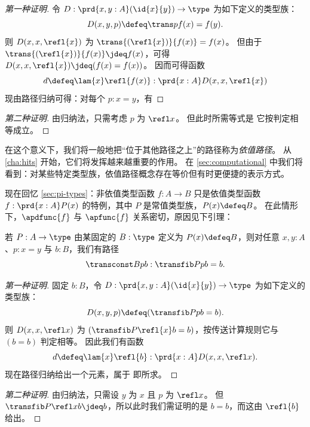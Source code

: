 \begin{proof}[第一种证明]
  令 $D:\prd{x,y:A} (\id{x}{y}) \to \type$ 为如下定义的类型族：
  \begin{equation*}
    D(x,y,p)\defeq \trans p {f(x)}= f(y).
  \end{equation*}
  则 $D(x,x,\refl{x})$ 为 $\trans{(\refl{x})}{f(x)}= f(x)$。
  但由于 $\trans{(\refl{x})}{f(x)}\jdeq f(x)$，可得 $D(x,x,\refl{x})\jdeq (f(x)= f(x))$。
  因而可得函数
  \begin{equation*}
    d\defeq\lam{x} \refl{f(x)}:\prd{x:A} D(x,x,\refl{x})
  \end{equation*}
  现由路径归纳可得：对每个 $p:x= y$，有
\end{proof}

\begin{proof}[第二种证明]
  由归纳法，只需考虑 $p$ 为 $\refl x$。
  但此时所需等式是
  它按判定相等成立。
\end{proof}

在这个意义下，我们将一般地把“位于其他路径之上”的路径称为\emph{依值路径}。
%
%
从 \cref{cha:hits} 开始，它们将发挥越来越重要的作用。
在 \cref{sec:computational} 中我们将看到：对某些特定类型族，依值路径概念存在等价但有时更便捷的表示方式。

现在回忆 \cref{sec:pi-types}：非依值类型函数 $f:A\to B$ 只是依值类型函数 $f:\prd{x:A} P(x)$ 的特例，其中 $P$ 是常值类型族，$P(x) \defeq B$。
在此情形下，$\apdfunc{f}$ 与 $\apfunc{f}$ 关系密切，原因见下引理：

\begin{lem}\label{thm:trans-trivial}
  若 $P:A\to\type$ 由某固定的 $B:\type$ 定义为 $P(x) \defeq B$，则对任意 $x,y:A$、$p:x=y$ 与 $b:B$，我们有路径
  \[ \transconst Bpb : \transfib P p b = b. \]
\end{lem}
\begin{proof}[第一种证明]
  固定 $b:B$，令 $D:\prd{x,y:A} (\id{x}{y}) \to \type$ 为如下定义的类型族：
  \[ D(x,y,p) \defeq (\transfib P p b = b). \]
  则 $D(x,x,\refl x)$ 为 $(\transfib P{\refl{x}}{b} = b)$，按传送计算规则它与 $(b=b)$ 判定相等。
  因此我们有函数
  \[ d \defeq \lam{x} \refl{b} : \prd{x:A} D(x,x,\refl x). \]
  现在路径归纳给出一个元素，属于
  即所求。
\end{proof}
\begin{proof}[第二种证明]
  由归纳法，只需设 $y$ 为 $x$ 且 $p$ 为 $\refl x$。
  但 $\transfib P {\refl x} b \jdeq b$，所以此时我们需证明的是 $b=b$，而这由 $\refl{b}$ 给出。
\end{proof}

